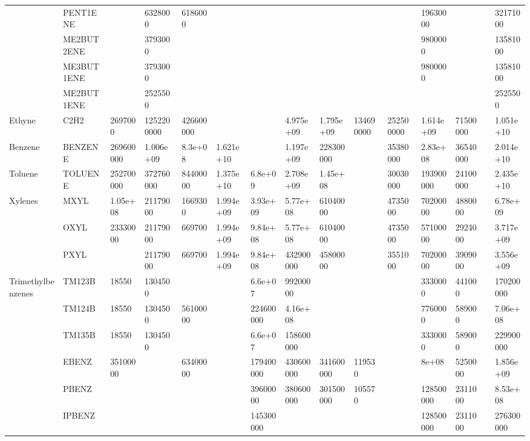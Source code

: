 \begin{longtable}{lllllllllllllll}
	 & PENT1ENE &  & 6328000 & 6186000 &  &  &  &  &  &  & 19630000 &  &  & 32171000 \\
	 & ME2BUT2ENE &  & 3793000 &  &  &  &  &  &  &  & 9800000 &  &  & 13581000 \\
	 & ME3BUT1ENE &  & 3793000 &  &  &  &  &  &  &  & 9800000 &  &  & 13581000 \\
	 & ME2BUT1ENE &  & 2525500 &  &  &  &  &  &  &  &  &  &  & 2525500 \\
	\hline Ethyne & C2H2 & 2697000 & 1252200000 & 426600000 &  &  & 4.975e+09 & 1.795e+09 & 134690000 & 252500000 & 1.614e+09 & 71500000 &  & 1.051e+10 \\ \hline
	Benzene & BENZENE & 269600000 & 1.006e+09 & 8.3e+08 & 1.621e+10 &  & 1.197e+09 & 228300000 &  & 35380000 & 2.83e+08 & 36540000 &  & 2.014e+10 \\
	\hline Toluene & TOLUENE & 252700000 & 372760000 & 84400000 & 1.375e+10 & 6.8e+09 & 2.708e+09 & 1.45e+08 &  & 30030000 & 193900000 & 24100000 &  & 2.435e+10 \\ \hline
	\multirow{3}{*}{Xylenes} & MXYL & 1.05e+08 & 21179000 & 1669300 & 1.994e+09 & 3.93e+09 & 5.77e+08 & 61040000 &  & 4735000 & 70200000 & 4880000 &  & 6.78e+09 \\
	 & OXYL & 23330000 & 21179000 & 669700 & 1.994e+09 & 9.84e+08 & 5.77e+08 & 61040000 &  & 4735000 & 57100000 & 2924000 &  & 3.717e+09 \\
	 & PXYL &  & 21179000 & 669700 & 1.994e+09 & 9.84e+08 & 432900000 & 45800000 &  & 3551000 & 70200000 & 3909000 &  & 3.556e+09 \\
	\hline \multirow{3}{*}{Trimethylbenzenes} & TM123B & 18550 & 1304500 &  &  & 6.6e+07 & 99200000 &  &  &  & 3330000 & 441000 &  & 170200000 \\
	 & TM124B & 18550 & 1304500 & 56100000 &  & 224600000 & 4.16e+08 &  &  &  & 7760000 & 589000 &  & 7.06e+08 \\
	 & TM135B & 18550 & 1304500 &  &  & 6.6e+07 & 158600000 &  &  &  & 3330000 & 589000 &  & 229900000 \\
	\hline \parbox[t]{2mm}{} & EBENZ & 35100000 &  & 63400000 &  & 179400000 & 430600000 & 341600000 & 119530 &  & 8e+08 & 5250000 &  & 1.856e+09 \\
	 & PBENZ &  &  &  &  & 39600000 & 380600000 & 301500000 & 105570 &  & 128500000 & 2311000 &  & 8.53e+08 \\
	 & IPBENZ &  &  &  &  & 145300000 &  &  &  &  & 128500000 & 2311000 &  & 276300000 \\

\end{longtable}
